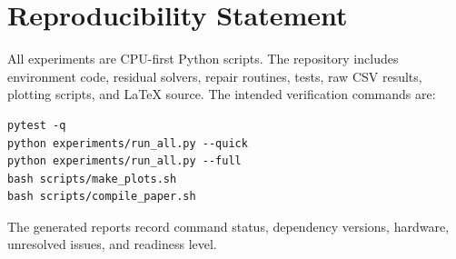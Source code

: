 \section{Reproducibility Statement}

All experiments are CPU-first Python scripts. The repository includes environment code, residual solvers, repair routines, tests, raw CSV results, plotting scripts, and LaTeX source. The intended verification commands are:
\begin{verbatim}
pytest -q
python experiments/run_all.py --quick
python experiments/run_all.py --full
bash scripts/make_plots.sh
bash scripts/compile_paper.sh
\end{verbatim}
The generated reports record command status, dependency versions, hardware, unresolved issues, and readiness level.
